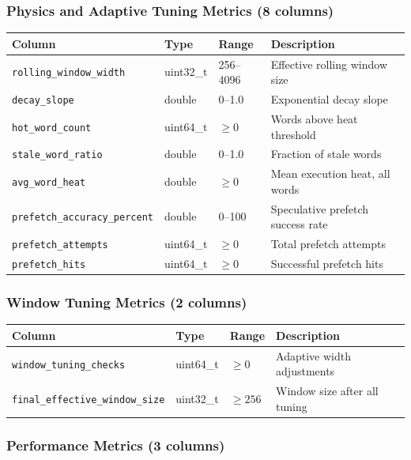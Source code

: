 \subsubsection{Physics and Adaptive Tuning Metrics (8 columns)}

\begin{center}
\begin{tabular}{llll}
\toprule
Column & Type & Range & Description \\
\midrule
\texttt{rolling\_window\_width}    & uint32\_t & 256--4096 & Effective rolling window size \\
\texttt{decay\_slope}              & double    & 0--1.0    & Exponential decay slope \\
\texttt{hot\_word\_count}          & uint64\_t & $\geq 0$  & Words above heat threshold \\
\texttt{stale\_word\_ratio}        & double    & 0--1.0    & Fraction of stale words \\
\texttt{avg\_word\_heat}           & double    & $\geq 0$  & Mean execution heat, all words \\
\texttt{prefetch\_accuracy\_percent} & double  & 0--100    & Speculative prefetch success rate \\
\texttt{prefetch\_attempts}        & uint64\_t & $\geq 0$  & Total prefetch attempts \\
\texttt{prefetch\_hits}            & uint64\_t & $\geq 0$  & Successful prefetch hits \\
\bottomrule
\end{tabular}
\end{center}

\subsubsection{Window Tuning Metrics (2 columns)}

\begin{center}
\begin{tabular}{llll}
\toprule
Column & Type & Range & Description \\
\midrule
\texttt{window\_tuning\_checks}         & uint64\_t & $\geq 0$   & Adaptive width adjustments \\
\texttt{final\_effective\_window\_size} & uint32\_t & $\geq 256$ & Window size after all tuning \\
\bottomrule
\end{tabular}
\end{center}

\subsubsection{Performance Metrics (3 columns)}

